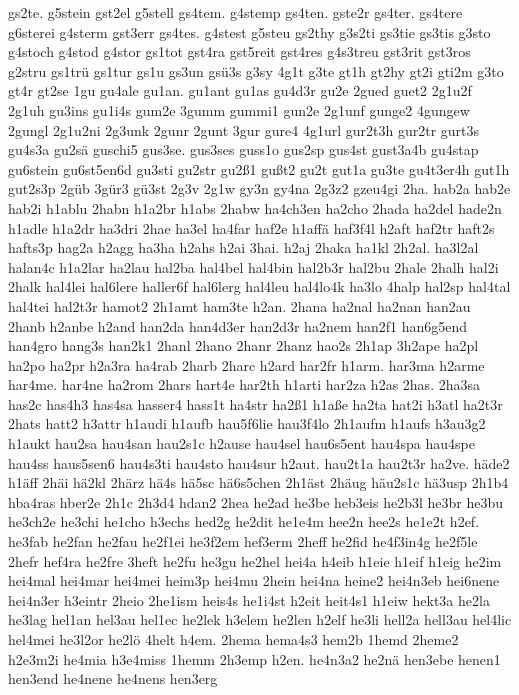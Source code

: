 {gs2te.
g5stein
gst2el
g5stell
gs4tem.
g4stemp
gs4ten.
gste2r
gs4ter.
gs4tere
g6sterei
g4sterm
gst3err
gs4tes.
g4stest
g5steu
gs2thy
g3s2ti
gs3tie
gs3tis
g3sto
g4stoch
g4stod
g4stor
gs1tot
gst4ra
gst5reit
gst4res
g4s3treu
gst3rit
gst3ros
g2stru
gs1trü
gs1tur
gs1u
gs3un
gsü3s
g3sy
4g1t
g3te
gt1h
gt2hy
gt2i
gti2m
g3to
gt4r
gt2se
1gu
gu4ale
gu1an.
gu1ant
gu1as
gu4d3r
gu2e
2gued
guet2
2g1u2f
2g1uh
gu3ins
gu1i4s
gum2e
3gumm
gummi1
gun2e
2g1unf
gunge2
4gungew
2gungl
2g1u2ni
2g3unk
2gunr
2gunt
3gur
gure4
4g1url
gur2t3h
gur2tr
gurt3s
gu4s3a
gu2sä
guschi5
gus3se.
gus3ses
guss1o
gus2sp
gus4st
gust3a4b
gu4stap
gu6stein
gu6st5en6d
gu3sti
gu2str
gu2ß1
gußt2
gu2t
gut1a
gu3te
gu4t3er4h
gut1h
gut2s3p
2güb
3gür3
gü3st
2g3v
2g1w
gy3n
gy4na
2g3z2
gzeu4gi
2ha.
hab2a
hab2e
hab2i
h1ablu
2habn
h1a2br
h1abs
2habw
ha4ch3en
ha2cho
2hada
ha2del
hade2n
h1adle
h1a2dr
ha3dri
2hae
ha3el
ha4far
haf2e
h1affä
haf3f4l
h2aft
haf2tr
haft2s
hafts3p
hag2a
h2agg
ha3ha
h2ahs
h2ai
3hai.
h2aj
2haka
ha1kl
2h2al.
ha3l2al
halan4c
h1a2lar
ha2lau
hal2ba
hal4bel
hal4bin
hal2b3r
hal2bu
2hale
2halh
hal2i
2halk
hal4lei
hal6lere
haller6f
hal6lerg
hal4leu
hal4lo4k
ha3lo
4halp
hal2sp
hal4tal
hal4tei
hal2t3r
hamot2
2h1amt
ham3te
h2an.
2hana
ha2nal
ha2nan
han2au
2hanb
h2anbe
h2and
han2da
han4d3er
han2d3r
ha2nem
han2f1
han6g5end
han4gro
hang3s
han2k1
2hanl
2hano
2hanr
2hanz
hao2s
2h1ap
3h2ape
ha2pl
ha2po
ha2pr
h2a3ra
ha4rab
2harb
2harc
h2ard
har2fr
h1arm.
har3ma
h2arme
har4me.
har4ne
ha2rom
2hars
hart4e
har2th
h1arti
har2za
h2as
2has.
2ha3sa
has2c
has4h3
has4sa
hasser4
hass1t
ha4str
ha2ß1
h1aße
ha2ta
hat2i
h3atl
ha2t3r
2hats
hatt2
h3attr
h1audi
h1aufb
hau5f6lie
hau3f4lo
2h1aufm
h1aufs
h3au3g2
h1aukt
hau2sa
hau4san
hau2s1c
h2ause
hau4sel
hau6s5ent
hau4spa
hau4spe
hau4ss
haus5sen6
hau4s3ti
hau4sto
hau4sur
h2aut.
hau2t1a
hau2t3r
ha2ve.
häde2
h1äff
2häi
hä2kl
2härz
hä4s
hä5sc
hä6s5chen
2h1äst
2häug
häu2s1c
hä3usp
2h1b4
hba4ras
hber2e
2h1c
2h3d4
hdan2
2hea
he2ad
he3be
heb3eis
he2b3l
he3br
he3bu
he3ch2e
he3chi
he1cho
h3echs
hed2g
he2dit
he1e4m
hee2n
hee2s
he1e2t
h2ef.
he3fab
he2fan
he2fau
he2f1ei
he3f2em
hef3erm
2heff
he2fid
he4f3in4g
he2f5le
2hefr
hef4ra
he2fre
3heft
he2fu
he3gu
he2hel
hei4a
h4eib
h1eie
h1eif
h1eig
he2im
hei4mal
hei4mar
hei4mei
heim3p
hei4mu
2hein
hei4na
heine2
hei4n3eb
hei6nene
hei4n3er
h3eintr
2heio
2he1ism
heis4s
he1i4st
h2eit
heit4s1
h1eiw
hekt3a
he2la
he3lag
hel1an
hel3au
hel1ec
he2lek
h3elem
he2len
h2elf
he3li
hell2a
hell3au
hel4lic
hel4mei
he3l2or
he2lö
4helt
h4em.
2hema
hema4s3
hem2b
1hemd
2heme2
h2e3m2i
he4mia
h3e4miss
1hemm
2h3emp
h2en.
he4n3a2
he2nä
hen3ebe
henen1
hen3end
he4nene
he4nens
hen3erg
}
